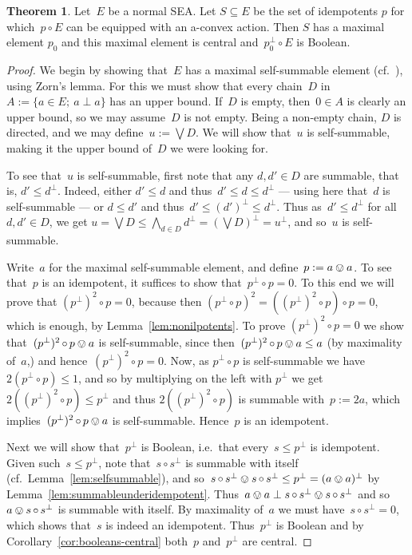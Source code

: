 \documentclass[a4paper, onecolumn, accepted=2020-12-22]{quantumarticle}
\newcommand{\mult}{\mathop{\circ}}
\newcounter{counter}
\theoremstyle{definition}
\newtheorem{theorem}[counter]{Theorem}
\begin{document}
\begin{theorem}\label{thm:a-convexthm}
Let~$E$ be a normal SEA.
Let $S\subseteq E$ be the set of idempotents $p$ for which~$p \mult E$ 
  can be equipped with an a-convex action.
  Then $S$ has a maximal element $p_0$
  and this maximal element is central
        and~$p_0^\perp \mult E$ is Boolean.
\end{theorem}
\begin{proof}
We begin by showing that~$E$ has a maximal self-summable element
(cf.~\cite[Lemma~56]{first}), using Zorn's lemma.
For this we must show 
that every chain~$D$ in~$A :=\{ a \in E;\  a \perp a \}$
has an upper bound.
If~$D$ is empty, then~$0 \in A$ is clearly an upper bound, so
we may assume~$D$ is not empty.
Being a non-empty chain, $D$ is directed,
and we may define~$u := \bigvee D$.
We will show that~$u$ is self-summable, 
making it the upper bound of~$D$ we were looking for.

To see that~$u$ is self-summable,
first note that any $d,d'\in D$ are summable,
that is, $d'\leq d^\perp$.
Indeed, either  $d'\leq d$ and thus~$d'\leq d\leq d^\perp$ --- using
here that~$d$ is self-summable --- or 
$d\leq d'$ and thus~$d'\leq (d')^\perp \leq d^\perp$.
Thus as~$d'\leq d^\perp$ for all~$d,d'\in D$,
  we get $u=\bigvee D \leq \bigwedge_{d\in D} d^\perp
  = (\bigvee D)^\perp= u^\perp$,
and so~$u$ is self-summable.

Write~$a$ for the maximal self-summable element,
and define~$p :=  a \ovee a$.
To see that~$p$ is an idempotent,
it suffices to show that~$p^\perp \mult p=0$.
To this end we will prove that $(p^\perp)^2\mult p = 0$,
because then $(p^\perp\mult p)^2 = ((p^\perp)^2\mult p)\mult p = 0$,
which is enough, by Lemma~\ref{lem:nonilpotents}.
To prove $(p^\perp)^2\mult p =0$ we show that~$(p^\perp)^2\mult p \ovee a$ is self-summable,
since then~$(p^\perp)^2\mult p \ovee a \leq a$
(by maximality of~$a$,)
and hence~$(p^\perp)^2 \mult p = 0$.
Now, as $p^\perp\mult p$ is self-summable we have~$2(p^\perp \mult p)\leq 1$,
  and so by multiplying on the left with $p^\perp$ we get $2((p^\perp)^2\mult p) \leq p^\perp$
  and thus $2((p^\perp)^2\mult p)$ is summable with~$p := 2a$,
  which implies~$(p^\perp)^2\mult p \ovee a$ is self-summable.
  Hence~$p$ is an idempotent.


Next we will show that~$p^\perp$ is Boolean,
        i.e.~that every~$s\leq p^\perp$ is idempotent.
Given such~$s\leq p^\perp$, note
  that~$s \mult s^\perp$ is summable with itself (cf.~Lemma~\ref{lem:selfsummable}),
        and so~$s \mult s^\perp \ovee s \mult s^\perp \leq p^\perp
            = (a \ovee a)^\perp$
            by Lemma~\ref{lem:summableunderidempotent}.
    Thus~$a \ovee a \perp s \mult s^\perp \ovee s \mult s^\perp$
    and so~$a \ovee s\mult s^\perp$ is summable with itself.
    By maximality of~$a$ we must have~$s \mult s^\perp = 0$,
    which shows that~$s$ is indeed an idempotent.
    Thus~$p^\perp$ is Boolean
        and by Corollary~\ref{cor:booleans-central}
        both~$p$ and~$p^\perp$ are central.


\end{proof}
\end{document}
